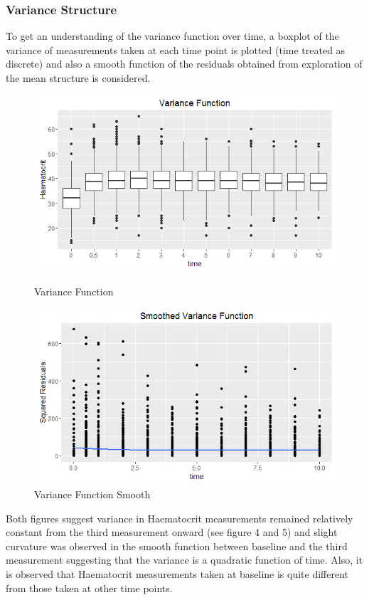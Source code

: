 \documentclass[11pt]{article}
\begin{document}
\subsubsection{Variance Structure}
To get an understanding of the variance function over time, a boxplot of the variance of measurements taken at each time point is plotted (time treated as discrete) and also a smooth function of the residuals obtained from exploration of the mean structure is considered.

\begin{figure}[H]
\centering
\begin{minipage}{.5\textwidth}
\includegraphics[scale=0.5]{variancefunction.png}
\caption{Variance Function}
\end{minipage}
\begin{minipage}{.4\textwidth}
\includegraphics[scale=0.5]{variancefunction2.png}
\caption{Variance Function Smooth}
\end{minipage}
\end{figure}

Both figures suggest variance in Haematocrit measurements remained relatively constant from the third measurement onward (see figure 4 and 5) and slight curvature was observed in the smooth function between baseline and the third measurement suggesting that the variance is a quadratic function of time. Also, it is observed that Haematocrit measurements taken at baseline is quite different from those taken at other time points. 
\end{document}
